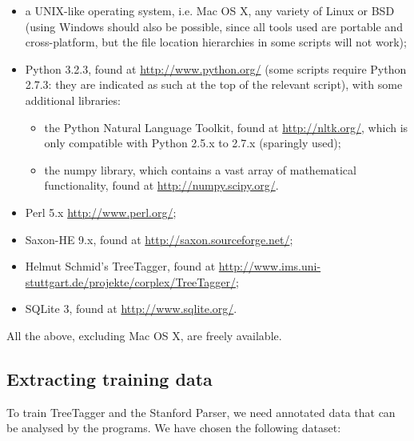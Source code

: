 \begin{itemize}

  \item a UNIX-like operating system, i.e. Mac OS X, any variety of Linux or
    BSD (using Windows should also be possible, since all tools used are
    portable and cross-platform, but the file location hierarchies in some
    scripts will not work);

  \item Python 3.2.3, found at \url{http://www.python.org/} (some scripts
    require Python 2.7.3: they are indicated as such at the top of the relevant
    script), with some additional libraries:

    \begin{itemize}

      \item the Python Natural Language Toolkit, found at
        \url{http://nltk.org/}, which is only compatible with Python 2.5.x to
        2.7.x (sparingly used);

      \item the numpy library, which contains a vast array of mathematical
        functionality, found at \url{http://numpy.scipy.org/}.

    \end{itemize}

  \item Perl 5.x \url{http://www.perl.org/};

  \item Saxon-HE 9.x, found at \url{http://saxon.sourceforge.net/};

  \item Helmut Schmid's TreeTagger, found at
    \url{http://www.ims.uni-stuttgart.de/projekte/corplex/TreeTagger/};

  \item SQLite 3, found at \url{http://www.sqlite.org/}.

\end{itemize}

All the above, excluding Mac OS X, are freely available.



\subsection{Extracting training data} %
\label{sub:extract_training_data}
To train TreeTagger and the Stanford Parser, we need annotated data that can be analysed by the programs. We have chosen the following dataset:


